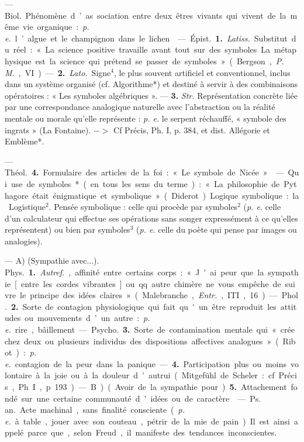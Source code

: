 \begin{itemize}[leftmargin=1cm, label=, itemsep=1pt]
 — \si{Biol.} Phénomène d’as
sociation entre deux êtres vivants
qui vivent de la même vie organique :
{\it p. e.} l’algue et le champignon dans
le lichen.

 — \si{Épist.} {\bf 1.} {\it Latiss.} Substitut
du réel : « La science positive travaille avant tout sur des symboles...
La métaphysique est la science qui
prétend se passer de symboles »
(Bergson, {\it P. M.}, VI). — {\bf 2.} {\it Lato.}
Signe$^4$, le plus souvent artificiel et
conventionnel, inclus dans un système organisé (cf. Algorithme*) et
destiné à servir à des combinaisons
opératoires : « Les symboles algébriques ». — {\bf 3.} {\it Str.} Représentation
concrète liée par une correspondance analogique naturelle avec
l’abstraction ou la réalité mentale
ou morale qu’elle représente : {\it p. e.} le
serpent réchauffé, « symbole des
ingrats » (La Fontaine). $->$ Cf
Précis, Ph. I, p. 384, et dist. Allégorie et Emblème*.

— \si{Théol.} {\bf 4.} Formulaire des articles de la foi : « Le symbole de
Nicée ».

 — Qui use de symboles*
(en tous les sens du terme) : « La
philosophie de Pythagore était énigmatique et symbolique » (Diderot).
Logique symbolique : la Logistique$^2$.
Pensée symbolique : celle qui procède
par symboles$^2$ ({\it p. e.} celle d’un calculateur
qui effectue ses opérations
sans songer expressément à ce
qu’elles représentent) ou bien par
symboles$^3$ ({\it p. e.} celle du poète qui
pense par images ou analogies).

 — A) (Sympathie avec...).
\si{Phys.} {\bf 1.} {\it Autref.}, affinité entre certains corps : « J'ai peur que la sympathie [entre les cordes vibrantes]
ou qq. autre chimère ne vous empêche de suivre le principe des idées
claires » (Malebranche, {\it Entr.}, ITI,
16). — \si{Phol.} {\bf 2.} Sorte de contagion
physiologique qui fait qu'un être
reproduit les attitudes ou mouvements d’un autre : {\it p. e.} rire, bâillement. — \si{Psycho.} {\bf 3.} Sorte de contamination mentale qui « crée chez
deux ou plusieurs individus des
dispositions affectives analogues »
(Ribot) : {\it p. e.} contagion de la peur
dans la panique. — {\bf 4.} Participation
plus ou moins volontaire à la joie ou
à la douleur d'autrui (Mitgefühl de
Scheler : cf. Précis, Ph. I, p. 193).

— B) (Avoir de la sympathie
pour...). {\bf 5.} Attachement fondé sur
une certaine communauté d'idées
ou de caractère.

 — \si{Ps. an.}
Acte machinal, sans finalité consciente ({\it p. e.} à table, jouer avec son
couteau, pétrir de la mie de pain).
Il est ainsi appelé parce que, selon
Freud, il manifeste des tendances
inconscientes.


\end{itemize}
